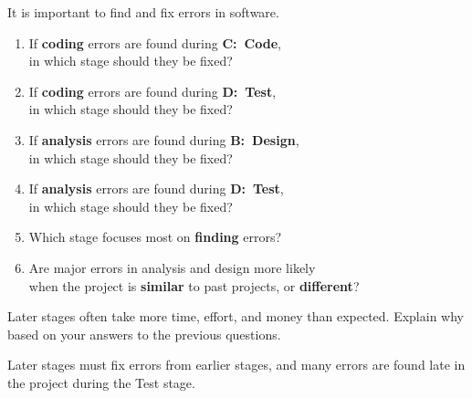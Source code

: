 \newpage

\Q It is important to find and fix errors in software.

\begin{enumerate}%

\item If \textbf{coding} errors are found during \textbf{C:~Code}, \\ in which stage should they be fixed?

\item If \textbf{coding} errors are found during \textbf{D:~Test}, \\ in which stage should they be fixed?

\item If \textbf{analysis} errors are found during \textbf{B:~Design}, \\ in which stage should they be fixed?

\item If \textbf{analysis} errors are found during \textbf{D:~Test}, \\ in which stage should they be fixed?

\item Which stage focuses most on \textbf{finding} errors?

\item Are major errors in analysis and design more likely \\ when the project is \textbf{similar} to past projects, or \textbf{different}?

\end{enumerate}


\Q Later stages often take more time, effort, and money than expected.
Explain why based on your answers to the previous questions.

\begin{answer}[5em]
Later stages must fix errors from earlier stages, and many errors are found late in the project during the Test stage.
\end{answer}
